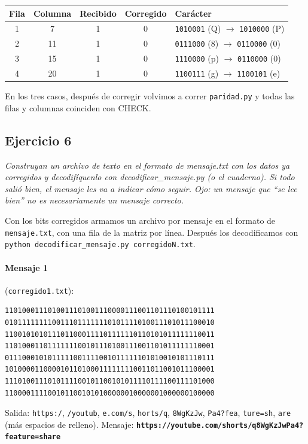 \documentclass[11pt,a4paper]{article}
\begin{document}
\begin{center}
\begin{tabular}{|c|c|c|c|l|}
\hline
\textbf{Fila} & \textbf{Columna} & \textbf{Recibido} & \textbf{Corregido} & \textbf{Carácter} \\
\hline
1 & 7 & 1 & 0 & \texttt{1010001} (Q) $\rightarrow$ \texttt{1010000} (P) \\
2 & 11 & 1 & 0 & \texttt{0111000} (8) $\rightarrow$ \texttt{0110000} (0) \\
3 & 15 & 1 & 0 & \texttt{1110000} (p) $\rightarrow$ \texttt{0110000} (0) \\
4 & 20 & 1 & 0 & \texttt{1100111} (g) $\rightarrow$ \texttt{1100101} (e) \\
\hline
\end{tabular}
\end{center}

En los tres casos, después de corregir volvimos a correr \texttt{paridad.py} y todas las filas y columnas coinciden con CHECK.

\subsection*{Ejercicio 6}

\textit{Construyan un archivo de texto en el formato de mensaje.txt con los datos ya corregidos y decodifíquenlo con decodificar\_mensaje.py (o el cuaderno). Si todo salió bien, el mensaje les va a indicar cómo seguir. Ojo: un mensaje que ``se lee bien'' no es necesariamente un mensaje correcto.}

\medskip

Con los bits corregidos armamos un archivo por mensaje en el formato de \texttt{mensaje.txt}, con una fila de la matriz por línea. Después los decodificamos con \texttt{python decodificar\_mensaje.py corregidoN.txt}.

\paragraph{Mensaje 1} (\texttt{corregido1.txt}):
\begin{verbatim}
1101000111010011101001110000111001101110100101111
0101111111100111011111110101111010011101011100010
1100101010111011000111101111110110101011111110011
1101000110111111100101110100111001101011111110001
0111000101011111001111001011111101010010101110111
1010000110000101101000111111110011011001011100001
1110100111010111100101100101011110111100111101000
1100001111001011001010100000010000001000000100000
\end{verbatim}
Salida: \texttt{https:/}, \texttt{/youtub}, \texttt{e.com/s}, \texttt{horts/q}, \texttt{8WgKzJw}, \texttt{Pa4?fea}, \texttt{ture=sh}, \texttt{are} (más espacios de relleno). Mensaje: \textbf{\texttt{https://youtube.com/shorts/q8WgKzJwPa4?feature=share}}
\end{document}
